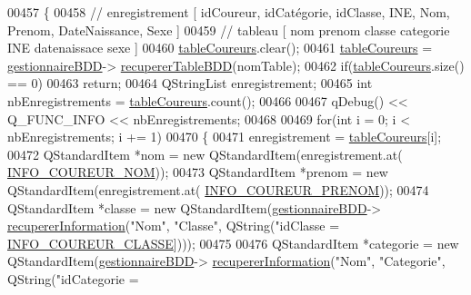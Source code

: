 \begin{DoxyCode}
00457 \{
00458     \textcolor{comment}{// enregistrement [ idCoureur, idCatégorie, idClasse, INE, Nom, Prenom, DateNaissance, Sexe ]}
00459     \textcolor{comment}{// tableau [ nom prenom classe categorie INE datenaissace sexe ]}
00460     \hyperlink{class_i_h_m_gestion_cross_a9bf93b48403da7bf152f013055152630}{tableCoureurs}.clear();
00461     \hyperlink{class_i_h_m_gestion_cross_a9bf93b48403da7bf152f013055152630}{tableCoureurs} = \hyperlink{class_i_h_m_gestion_cross_a440bac63a3e51db3e2c08e883f8cafc9}{gestionnaireBDD}->
      \hyperlink{class_gestion_b_d_d_a2b44ebc5bf5b1a7babde6512817a85b4}{recupererTableBDD}(nomTable);
00462     \textcolor{keywordflow}{if}(\hyperlink{class_i_h_m_gestion_cross_a9bf93b48403da7bf152f013055152630}{tableCoureurs}.size() == 0)
00463         \textcolor{keywordflow}{return};
00464     QStringList enregistrement;
00465     \textcolor{keywordtype}{int} nbEnregistrements = \hyperlink{class_i_h_m_gestion_cross_a9bf93b48403da7bf152f013055152630}{tableCoureurs}.count();
00466 
00467     qDebug() << Q\_FUNC\_INFO << nbEnregistrements;
00468 
00469     \textcolor{keywordflow}{for}(\textcolor{keywordtype}{int} i = 0; i < nbEnregistrements; i += 1)
00470     \{
00471         enregistrement = \hyperlink{class_i_h_m_gestion_cross_a9bf93b48403da7bf152f013055152630}{tableCoureurs}[i];
00472         QStandardItem *nom = \textcolor{keyword}{new} QStandardItem(enregistrement.at(
      \hyperlink{ihmchronocross_8h_a71b99ea06ae916bcd158edbd441c8c24}{INFO\_COUREUR\_NOM}));
00473         QStandardItem *prenom = \textcolor{keyword}{new} QStandardItem(enregistrement.at(
      \hyperlink{ihmchronocross_8h_a68fd2611ad0ef66da1a71726675067e7}{INFO\_COUREUR\_PRENOM}));
00474         QStandardItem *classe = \textcolor{keyword}{new} QStandardItem(\hyperlink{class_i_h_m_gestion_cross_a440bac63a3e51db3e2c08e883f8cafc9}{gestionnaireBDD}->
      \hyperlink{class_gestion_b_d_d_a0a2fa02b90974684658937fbfb55bf0a}{recupererInformation}(\textcolor{stringliteral}{"Nom"}, \textcolor{stringliteral}{"Classe"}, QString(\textcolor{stringliteral}{"idClasse = %
      \hyperlink{ihmchronocross_8h_a104dfa4cfc656a690caaec36fd4d3e2d}{INFO\_COUREUR\_CLASSE}])));
00475 
00476         QStandardItem *categorie = \textcolor{keyword}{new} QStandardItem(\hyperlink{class_i_h_m_gestion_cross_a440bac63a3e51db3e2c08e883f8cafc9}{gestionnaireBDD}->
      \hyperlink{class_gestion_b_d_d_a0a2fa02b90974684658937fbfb55bf0a}{recupererInformation}(\textcolor{stringliteral}{"Nom"}, \textcolor{stringliteral}{"Categorie"}, QString(\textcolor{stringliteral}{"idCategorie = %
}}
\end{DoxyCode}
